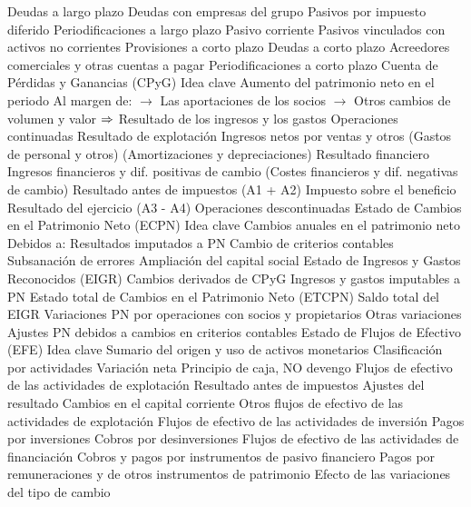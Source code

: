 \documentclass{nuevotema}
\begin{document}
\begin{esquemal}
				\4 Deudas a largo plazo
				\4 Deudas con empresas del grupo
				\4 Pasivos por impuesto diferido
				\4 Periodificaciones a largo plazo
			\3[iii'] Pasivo corriente
				\4 Pasivos vinculados con activos no corrientes
				\4 Provisiones a corto plazo
				\4 Deudas a corto plazo
				\4 Acreedores comerciales y otras cuentas a pagar
				\4 Periodificaciones a corto plazo
		\2[II] Cuenta de Pérdidas y Ganancias (CPyG)
			\3 Idea clave
				\4 Aumento del patrimonio neto en el periodo
				\4[] Al margen de:
				\4[] $\to$ Las aportaciones de los socios
				\4[] $\to$ Otros cambios de volumen y valor
				\4[] $\Rightarrow$ Resultado de los ingresos y los gastos
			\3 Operaciones continuadas
				\4[A1] Resultado de explotación
				\4[] Ingresos netos por ventas y otros
				\4[] (Gastos de personal y otros)
				\4[] (Amortizaciones y depreciaciones)
				\4[A2] Resultado financiero
				\4[] Ingresos financieros y dif. positivas de cambio
				\4[] (Costes financieros y dif. negativas de cambio)
				\4[A3] Resultado antes de impuestos (A1 + A2)
				\4[-A4] Impuesto sobre el beneficio
				\4[=] Resultado del ejercicio (A3 - A4)
			\3 Operaciones descontinuadas
		\2[III] Estado de Cambios en el Patrimonio Neto (ECPN)
			\3 Idea clave
				\4 Cambios anuales en el patrimonio neto
				\4 Debidos a:
				\4[] Resultados imputados a PN
				\4[] Cambio de criterios contables
				\4[] Subsanación de errores
				\4[] Ampliación del capital social
			\3[i] Estado de Ingresos y Gastos Reconocidos (EIGR)
				\4 Cambios derivados de CPyG
				\4 Ingresos y gastos imputables a PN
			\3[ii] Estado total de Cambios en el Patrimonio Neto (ETCPN)
				\4 Saldo total del EIGR
				\4 Variaciones PN por operaciones con socios y propietarios
				\4 Otras variaciones
				\4 Ajustes PN debidos a cambios en criterios contables
		\2[IV] Estado de Flujos de Efectivo (EFE)
			\3 Idea clave
				\4 Sumario del origen y uso de activos monetarios
				\4 Clasificación por actividades
				\4 Variación neta
				\4 Principio de caja, NO devengo
			\3[i] Flujos de efectivo de las actividades de explotación
				\4 Resultado antes de impuestos
				\4 Ajustes del resultado
				\4 Cambios en el capital corriente
				\4 Otros flujos de efectivo de las actividades de explotación
			\3[ii] Flujos de efectivo de las actividades de inversión
				\4 Pagos por inversiones
				\4 Cobros por desinversiones
			\3[iii] Flujos de efectivo de las actividades de financiación
				\4 Cobros y pagos por instrumentos de pasivo financiero
				\4 Pagos por remuneraciones y de otros instrumentos de patrimonio
			\3[iv] Efecto de las variaciones del tipo de cambio

\end{esquemal}
\end{document}
